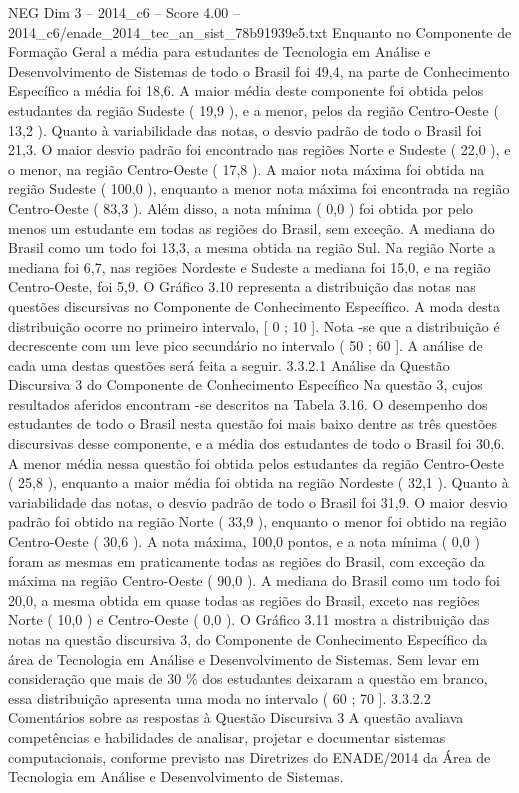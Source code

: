\begin{textsample}{NEG Dim 3 – 2014\_c6 – Score 4.00 – 2014\_c6/enade\_2014\_tec\_an\_sist\_78b91939e5.txt}
Enquanto no Componente de Formação Geral a média para estudantes de Tecnologia em Análise e Desenvolvimento de Sistemas de todo o Brasil foi 49,4, na parte de Conhecimento Específico a média foi 18,6.
A maior média deste componente foi obtida pelos estudantes da região Sudeste ( 19,9 ), e a menor, pelos da região Centro-Oeste ( 13,2 ).
Quanto à variabilidade das notas, o desvio padrão de todo o Brasil foi 21,3.
O maior desvio padrão foi encontrado nas regiões Norte e Sudeste ( 22,0 ), e o menor, na região Centro-Oeste ( 17,8 ).
A maior nota máxima foi obtida na região Sudeste ( 100,0 ), enquanto a menor nota máxima foi encontrada na região Centro-Oeste ( 83,3 ).
Além disso, a nota mínima ( 0,0 ) foi obtida por pelo menos um estudante em todas as regiões do Brasil, sem exceção.
A mediana do Brasil como um todo foi 13,3, a mesma obtida na região Sul.
Na região Norte a mediana foi 6,7, nas regiões Nordeste e Sudeste a mediana foi 15,0, e na região Centro-Oeste, foi 5,9.
O Gráfico 3.10 representa a distribuição das notas nas questões discursivas no Componente de Conhecimento Específico.
A moda desta distribuição ocorre no primeiro intervalo, [ 0 ; 10 ].
Nota -se que a distribuição é decrescente com um leve pico secundário no intervalo ( 50 ; 60 ].
A análise de cada uma destas questões será feita a seguir. 3.3.2.1 Análise da Questão Discursiva 3 do Componente de Conhecimento Específico Na questão 3, cujos resultados aferidos encontram -se descritos na Tabela 3.16.
O desempenho dos estudantes de todo o Brasil nesta questão foi mais baixo dentre as três questões discursivas desse componente, e a média dos estudantes de todo o Brasil foi 30,6.
A menor média nessa questão foi obtida pelos estudantes da região Centro-Oeste ( 25,8 ), enquanto a maior média foi obtida na região Nordeste ( 32,1 ).
Quanto à variabilidade das notas, o desvio padrão de todo o Brasil foi 31,9.
O maior desvio padrão foi obtido na região Norte ( 33,9 ), enquanto o menor foi obtido na região Centro-Oeste ( 30,6 ).
A nota máxima, 100,0 pontos, e a nota mínima ( 0,0 ) foram as mesmas em praticamente todas as regiões do Brasil, com exceção da máxima na região Centro-Oeste ( 90,0 ).
A mediana do Brasil como um todo foi 20,0, a mesma obtida em quase todas as regiões do Brasil, exceto nas regiões Norte ( 10,0 ) e Centro-Oeste ( 0,0 ).
O Gráfico 3.11 mostra a distribuição das notas na questão discursiva 3, do Componente de Conhecimento Específico da área de Tecnologia em Análise e Desenvolvimento de Sistemas.
Sem levar em consideração que mais de 30 \% dos estudantes deixaram a questão em branco, essa distribuição apresenta uma moda no intervalo ( 60 ; 70 ]. 3.3.2.2 Comentários sobre as respostas à Questão Discursiva 3 A questão avaliava competências e habilidades de analisar, projetar e documentar sistemas computacionais, conforme previsto nas Diretrizes do ENADE/2014 da Área de Tecnologia em Análise e Desenvolvimento de Sistemas.

\end{textsample}
